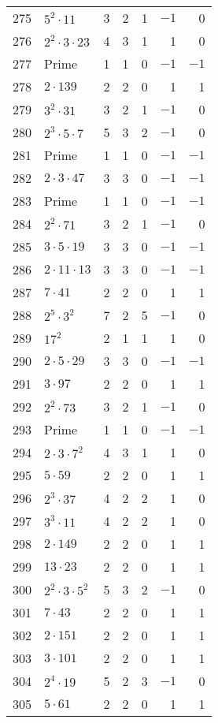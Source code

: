 \documentclass[12pt]{article}
\begin{document}
\begin{tabular}{|r|l|r|r|r|r|r|}
275 & $5^2 \cdot 11$ & 3 & 2 & 1 & $-1$ & 0 \\
276 & $2^2 \cdot 3 \cdot 23$ & 4 & 3 & 1 & 1 & 0 \\
277 & Prime & 1 & 1 & 0 & $-1$ & $-1$ \\
278 & $2 \cdot 139$ & 2 & 2 & 0 & 1 & 1 \\
279 & $3^2 \cdot 31$ & 3 & 2 & 1 & $-1$ & 0 \\
280 & $2^3 \cdot 5 \cdot 7$ & 5 & 3 & 2 & $-1$ & 0 \\
281 & Prime & 1 & 1 & 0 & $-1$ & $-1$ \\
282 & $2 \cdot 3 \cdot 47$ & 3 & 3 & 0 & $-1$ & $-1$ \\
283 & Prime & 1 & 1 & 0 & $-1$ & $-1$ \\
284 & $2^2 \cdot 71$ & 3 & 2 & 1 & $-1$ & 0 \\
285 & $3 \cdot 5 \cdot 19$ & 3 & 3 & 0 & $-1$ & $-1$ \\
286 & $2 \cdot 11 \cdot 13$ & 3 & 3 & 0 & $-1$ & $-1$ \\
287 & $7 \cdot 41$ & 2 & 2 & 0 & 1 & 1 \\
288 & $2^5 \cdot 3^2$ & 7 & 2 & 5 & $-1$ & 0 \\
289 & $17^2$ & 2 & 1 & 1 & 1 & 0 \\
290 & $2 \cdot 5 \cdot 29$ & 3 & 3 & 0 & $-1$ & $-1$ \\
291 & $3 \cdot 97$ & 2 & 2 & 0 & 1 & 1 \\
292 & $2^2 \cdot 73$ & 3 & 2 & 1 & $-1$ & 0 \\
293 & Prime & 1 & 1 & 0 & $-1$ & $-1$ \\
294 & $2 \cdot 3 \cdot 7^2$ & 4 & 3 & 1 & 1 & 0 \\
295 & $5 \cdot 59$ & 2 & 2 & 0 & 1 & 1 \\
296 & $2^3 \cdot 37$ & 4 & 2 & 2 & 1 & 0 \\
297 & $3^3 \cdot 11$ & 4 & 2 & 2 & 1 & 0 \\
298 & $2 \cdot 149$ & 2 & 2 & 0 & 1 & 1 \\
299 & $13 \cdot 23$ & 2 & 2 & 0 & 1 & 1 \\
300 & $2^2 \cdot 3 \cdot 5^2$ & 5 & 3 & 2 & $-1$ & 0 \\
301 & $7 \cdot 43$ & 2 & 2 & 0 & 1 & 1 \\
302 & $2 \cdot 151$ & 2 & 2 & 0 & 1 & 1 \\
303 & $3 \cdot 101$ & 2 & 2 & 0 & 1 & 1 \\
304 & $2^4 \cdot 19$ & 5 & 2 & 3 & $-1$ & 0 \\
305 & $5 \cdot 61$ & 2 & 2 & 0 & 1 & 1 \\

\end{tabular}
\end{document}
